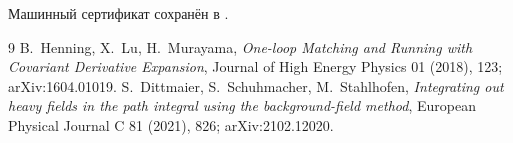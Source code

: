 Машинный сертификат сохранён в
.

\begin{thebibliography}{9}
B.~Henning, X.~Lu, H.~Murayama,
\emph{One-loop Matching and Running with Covariant Derivative Expansion},
Journal of High Energy Physics 01 (2018), 123; arXiv:1604.01019.
S.~Dittmaier, S.~Schuhmacher, M.~Stahlhofen,
\emph{Integrating out heavy fields in the path integral using the
background-field method}, European Physical Journal C 81 (2021), 826;
arXiv:2102.12020.
\end{thebibliography}